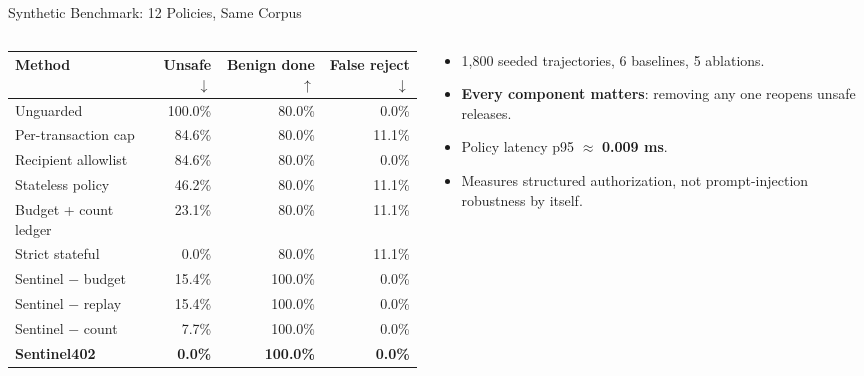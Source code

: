 \documentclass{beamer}
\newcommand{\good}[1]{\textcolor{okgreen}{\textbf{#1}}}
\begin{document}
\begin{frame}{Synthetic Benchmark: 12 Policies, Same Corpus}
\scriptsize
\begin{columns}[T,onlytextwidth]
  \begin{column}{0.60\textwidth}
    \begin{tabular}{@{}lrrr@{}}
      \toprule
      \textbf{Method} & \textbf{Unsafe} \(\downarrow\) & \textbf{Benign done} \(\uparrow\)
        & \textbf{False reject} \(\downarrow\) \\
      \midrule
      Unguarded              & 100.0\% & 80.0\%  & 0.0\% \\
      Per-transaction cap    & 84.6\%  & 80.0\%  & 11.1\% \\
      Recipient allowlist    & 84.6\%  & 80.0\%  & 0.0\% \\
      Stateless policy       & 46.2\%  & 80.0\%  & 11.1\% \\
      Budget + count ledger  & 23.1\%  & 80.0\%  & 11.1\% \\
      Strict stateful        & 0.0\%   & 80.0\%  & 11.1\% \\
      \midrule
      Sentinel \(-\) budget   & 15.4\%  & 100.0\% & 0.0\% \\
      Sentinel \(-\) replay   & 15.4\%  & 100.0\% & 0.0\% \\
      Sentinel \(-\) count    & 7.7\%   & 100.0\% & 0.0\% \\
      \midrule
      \textbf{Sentinel402}   & \good{0.0\%} & \good{100.0\%} & \good{0.0\%} \\
      \bottomrule
    \end{tabular}
  \end{column}
  \begin{column}{0.36\textwidth}
    \footnotesize
    \begin{itemize}
      \setlength{\itemsep}{3pt}
      \item 1,800 seeded trajectories, 6 baselines, 5 ablations.
      \item \textbf{Every component matters}: removing any one reopens
            unsafe releases.
      \item Policy latency p95 \(\approx\) \textbf{0.009 ms}.
      \item Measures structured authorization, not prompt-injection
            robustness by itself.
    \end{itemize}
  \end{column}
\end{columns}
\end{frame}
\end{document}

